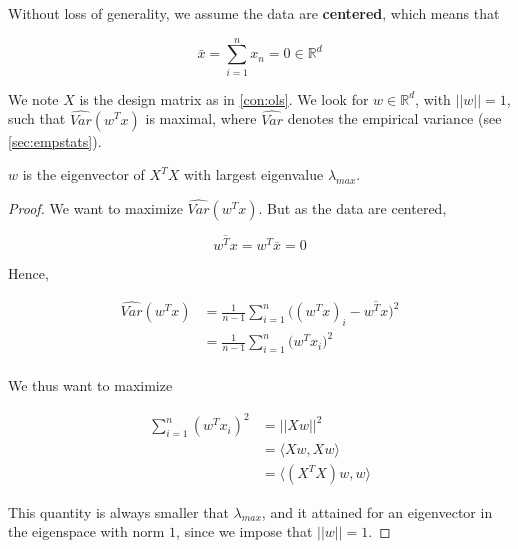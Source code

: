 \documentclass[
10pt, %
a4paper, %
oneside, %
headinclude,footinclude, %
BCOR5mm, %
]{scrartcl}
\begin{document}
Without loss of generality, we assume the data are \textbf{{centered}}, which means that

\begin{equation}
\bar{x} = \sum^{n}_{i=1} x_n=0\in \mathbb{R}^d
\end{equation}

We note $X$ is the design matrix as in \ref{con:ols}. We look for $w\in \mathbb{R}^d$, with $||w||=1$, such that $ \hat{Var}(w^Tx)$ is maximal, where $ \hat{Var}$ denotes the empirical variance (see \ref{sec:empstats}).

\begin{proposition}
    $w$ is the eigenvector of $X^TX$ with largest eigenvalue $\lambda_{max}$.
\end{proposition}

\begin{proof}
    We want to maximize $ \hat{Var}(w^Tx)$. But as the data are centered, 

    \begin{equation}
            \label{eq:}
            \overline{w^Tx} = w^T \overline{x} = 0
    \end{equation}

    Hence,

    \begin{equation}
        \begin{aligned}
            \label{eq:}
	    \hat{Var}(w^Tx) &= \frac{1}{n-1}  \sum^{n}_{i=1} \big((w^Tx)_i- \overline{w^Tx}  \big)^2\\
	    &= \frac{1}{n-1}  \sum^{n}_{i=1} \big(w^Tx_i \big)^2\\
        \end{aligned}
    \end{equation}

    We thus want to maximize

    \begin{equation*}
        \begin{aligned}
	    \sum^{n}_{i=1} (w^Tx_i)^2 &= ||Xw||^2\\
	    &= \langle Xw, Xw \rangle\\
	    &= \langle (X^TX)w, w \rangle
        \end{aligned}
    \end{equation*}

    This quantity is always smaller that $\lambda_{max}$, and it attained for an eigenvector in the eigenspace with norm $1$, since we impose that $||w||=1$.

\end{proof}
\end{document}
